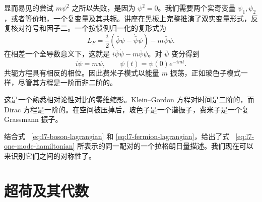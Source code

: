 \begin{classroomqa}
\end{classroomqa}

显而易见的尝试 \(m\psi^2\) 之所以失败，是因为 \(\psi^2=0\)。我们需要两个实奇变量 \(\psi_1,\psi_2\)，或者等价地，一个复变量及其共轭。讲座在黑板上完整推演了双实变量形式，反复核对符号和因子二。一个按惯例归一化的复形式为
\begin{equation}
L_F=\frac{i}{2}
\left(\bar\psi\dot\psi-\dot{\bar\psi}\psi\right)
-m\bar\psi\psi.
\label{eq:l7-fermion-lagrangian}
\end{equation}
在相差一个全导数意义下，这就是 \(i\bar\psi\dot\psi-m\bar\psi\psi\)。对 \(\bar\psi\) 变分得到
\begin{equation}
i\dot\psi=m\psi,
\qquad
\psi(t)=\psi(0)e^{-imt}.
\label{eq:l7-fermion-eom}
\end{equation}
共轭方程具有相反的相位。因此费米子模式以能量 \(m\) 振荡，正如玻色子模式一样，尽管其方程是一阶而非二阶的。


这是一个熟悉相对论性对比的零维缩影。Klein--Gordon 方程对时间是二阶的，而 Dirac 方程是一阶的。在空间被压掉后，玻色子是一个谐振子，费米子是一个复 Grassmann 振子。

\begin{classroomqa}
\end{classroomqa}

结合式 ~\eqref{eq:l7-boson-lagrangian} 和 \eqref{eq:l7-fermion-lagrangian}，给出了式 ~\eqref{eq:l7-one-mode-hamiltonian} 所表示的同一配对的一个拉格朗日量描述。我们现在可以来识别它们之间的对称性了。

\section{超荷及其代数}

